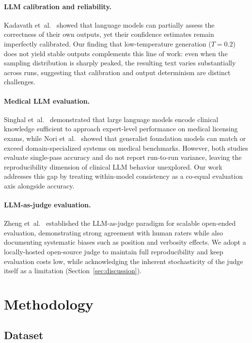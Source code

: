 \documentclass[11pt]{article}
\providecommand{\DIFaddtex}[1]{{\protect\color{blue}\uwave{#1}}} %
\providecommand{\DIFaddbegin}{} %
\providecommand{\DIFaddend}{} %
\providecommand{\DIFadd}[1]{\texorpdfstring{\DIFaddtex{#1}}{#1}} %
\providecommand{\DIFaddincludegraphics}[2][]{{\color{blue}\fbox{\DIFOincludegraphics[#1]{#2}}}} %
\DeclareRobustCommand{\DIFaddbegin}{\DIFOaddbegin \let\includegraphics\DIFaddincludegraphics} %
\DeclareRobustCommand{\DIFaddend}{\DIFOaddend \let\includegraphics\DIFOincludegraphics} %
\begin{document}
\paragraph{LLM calibration and reliability.}
Kadavath et~al.~\cite{kadavath2022calibration} showed that language
models can partially assess the correctness of their own outputs, yet
their confidence estimates remain imperfectly calibrated.
Our finding that low-temperature generation ($T{=}0.2$) does not yield
stable outputs complements this line of work: even when the sampling
distribution is sharply peaked, the resulting text varies substantially
across runs, suggesting that calibration and output determinism are
distinct challenges.

\paragraph{Medical LLM evaluation.}
Singhal et~al.~\cite{singhal2023large} demonstrated that large language
models encode clinical knowledge sufficient to approach expert-level
performance on medical licensing exams, while
Nori et~al.~\cite{nori2023gpt4med} showed that generalist foundation
models can match or exceed domain-specialized systems on medical
benchmarks.
However, both studies evaluate single-pass accuracy and do not report
run-to-run variance, leaving the reproducibility dimension of clinical
LLM behavior unexplored. Our work addresses this gap by treating
within-model consistency as a co-equal evaluation axis alongside
accuracy.

\paragraph{LLM-as-judge evaluation.}
Zheng et~al.~\cite{zheng2023judging} established the LLM-as-judge
paradigm for scalable open-ended evaluation, demonstrating strong
agreement with human raters while also documenting systematic biases
such as position and verbosity effects.
We adopt a locally-hosted open-source judge to maintain full
reproducibility and keep evaluation costs low, while acknowledging the
inherent stochasticity of the judge itself as a limitation
(Section~\ref{sec:discussion}).

\section{Methodology}

\subsection{Dataset\DIFaddbegin \DIFadd{s}\DIFaddend  }
\end{document}
